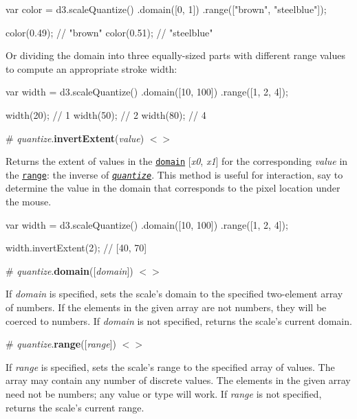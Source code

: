 \begin{DoxyCode}
var color = d3.scaleQuantize()
    .domain([0, 1])
    .range(["brown", "steelblue"]);

color(0.49); // "brown"
color(0.51); // "steelblue"
\end{DoxyCode}


Or dividing the domain into three equally-\/sized parts with different range values to compute an appropriate stroke width\+:


\begin{DoxyCode}
var width = d3.scaleQuantize()
    .domain([10, 100])
    .range([1, 2, 4]);

width(20); // 1
width(50); // 2
width(80); // 4
\end{DoxyCode}


\label{_quantize_invertExtent}%
\# {\itshape quantize}.{\bfseries invert\+Extent}({\itshape value}) \href{https://github.com/d3/d3-scale/blob/master/src/quantize.js#L31}{\tt $<$$>$}

Returns the extent of values in the \href{#quantize_domain}{\tt domain} \mbox{[}{\itshape x0}, {\itshape x1}\mbox{]} for the corresponding {\itshape value} in the \href{#quantize_range}{\tt range}\+: the inverse of \href{#_quantize}{\tt {\itshape quantize}}. This method is useful for interaction, say to determine the value in the domain that corresponds to the pixel location under the mouse.


\begin{DoxyCode}
var width = d3.scaleQuantize()
    .domain([10, 100])
    .range([1, 2, 4]);

width.invertExtent(2); // [40, 70]
\end{DoxyCode}


\label{_quantize_domain}%
\# {\itshape quantize}.{\bfseries domain}(\mbox{[}{\itshape domain}\mbox{]}) \href{https://github.com/d3/d3-scale/blob/master/src/quantize.js#L23}{\tt $<$$>$}

If {\itshape domain} is specified, sets the scale’s domain to the specified two-\/element array of numbers. If the elements in the given array are not numbers, they will be coerced to numbers. If {\itshape domain} is not specified, returns the scale’s current domain.

\label{_quantize_range}%
\# {\itshape quantize}.{\bfseries range}(\mbox{[}{\itshape range}\mbox{]}) \href{https://github.com/d3/d3-scale/blob/master/src/quantize.js#L27}{\tt $<$$>$}

If {\itshape range} is specified, sets the scale’s range to the specified array of values. The array may contain any number of discrete values. The elements in the given array need not be numbers; any value or type will work. If {\itshape range} is not specified, returns the scale’s current range.

